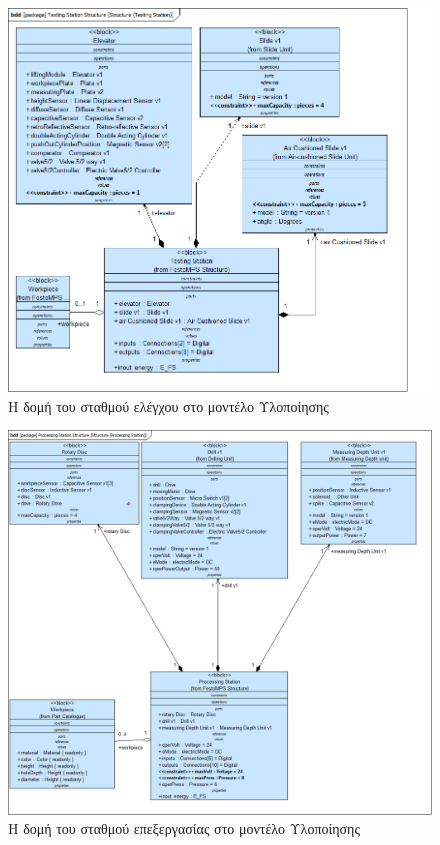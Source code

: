 \documentclass[a4paper,12pt,twoside]{report}
\begin{document}
{\begin{appendices}
				\begin{figure}[hp]
					\centering
					\includegraphics[scale=0.50]{DesignModel_Structure(TestingStation).png}
					\caption{Η δομή του σταθμού ελέγχου στο μοντέλο Υλοποίησης}
					\label{φωτ:Η δομή του σταθμού ελέγχου στο μοντέλο Υλοποίησης}
				\end{figure}
				
				\begin{figure}[hp]
					\centering
					\includegraphics[scale=0.30]{DesignModel_Structure(ProcessingStation).png}
					\caption{Η δομή του σταθμού επεξεργασίας στο μοντέλο Υλοποίησης}
					\label{φωτ:Η δομή του σταθμού επεξεργασίας στο μοντέλο Υλοποίησης}
				\end{figure}
				

\end{appendices}}
\end{document}
